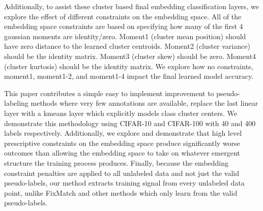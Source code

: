 \documentclass[10pt,twocolumn,letterpaper]{article}
\begin{document}

Additionally, to assist these cluster based final embedding classification layers, we explore the effect of different constraints on the embedding space.
All of the embedding space constraints are based on specifying how many of the first 4 gaussian moments are identity/zero.
Moment1 (cluster mean position) should have zero distance to the learned cluster centroids. %
Moment2 (cluster variance) should be the identity matrix.
Moment3 (cluster skew) should be zero.
Moment4 (cluster kurtosis) should be the identity matrix. 
We explore how no constraints, moment1, moment1-2, and moment1-4 impact the final learned model accuracy.

This paper contributes a simple easy to implement improvement to pseudo-labeling methods where very few annotations are available, replace the last linear layer with a kmeans layer which explicitly models class cluster centers.
We demonstrate this methodology using CIFAR-10 and CIFAR-100 \cite{cifar10} with 40 and 400 labels respectively. 
Additionally, we explore and demonstrate that high level prescriptive constraints on the embedding space produce significantly worse outcomes than allowing the embedding space to take on whatever emergent structure the training process produces. 
Finally, because the embedding constraint penalties are applied to all unlabeled data and not just the valid pseudo-labels, our method extracts training signal from every unlabeled data point, unlike FixMatch \cite{sohn2020fixmatch} and other methods which only learn from the valid pseudo-labels.





\end{document}
